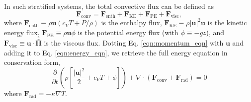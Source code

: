 \documentclass[aps, prl, twocolumn, groupedaddress]{revtex4-1}
\newcommand{\Div}[1]{\ensuremath{\nabla\cdot\left( #1\right)}}
\newcommand{\grad}{\ensuremath{\nabla}}
\newcommand{\stressT}{\ensuremath{\bm{\bar{\bar{\Pi}}}}}
\begin{document}
In such stratified systems, the total convective flux can be defined as
\begin{equation}
\bm{F}_{\text{conv}} = \bm{F}_{\text{enth}} + \bm{F}_{\text{KE}} + \bm{F}_{\text{PE}} + \bm{F}_{\text{visc}},
\end{equation}
where $\bm{F}_{\text{enth}} \equiv \rho\bm{u}(c_V T + P/\rho)$ is the enthalpy flux, $\bm{F}_{\text{KE}} \equiv 
\rho|\bm{u}|^2\bm{u}$ is the kinetic energy flux, $\bm{F}_{\text{PE}} \equiv \rho\bm{u}\phi$ is the potential
energy flux (with $\phi \equiv -gz$), 
and $\bm{F}_{\text{visc}} \equiv \bm{u}\cdot\stressT$ is the viscous flux.  Dotting 
Eq. \ref{eqn:momentum_eqn} with $\bm{u}$ and adding it to 
Eq. \ref{eqn:energy_eqn}, we retrieve the full energy equation in conservation form,
\begin{equation}
\frac{\partial}{\partial t}\left(\rho\left[\frac{|\bm{u}|^2}{2} + c_V T + \phi\right]\right) +
\Div{\bm{F}_{\text{conv}} + \bm{F}_{\text{rad}}} = 0
	\label{eqn:energy_eqn_full}
\end{equation}
where $\bm{F}_{\text{rad}} = -\kappa \grad T$. 
\end{document}
